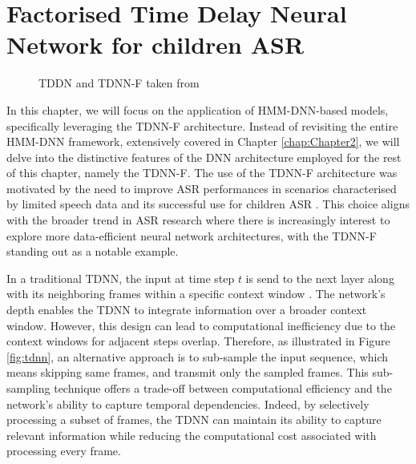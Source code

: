 \section{Factorised Time Delay Neural Network for children ASR}
\label{sec:TDNNF}
\begin{figure}[ht]
    \centering
    \caption{TDDN and TDNN-F taken from \cite{tdnnf-children}}
\end{figure}
In this chapter, we will focus on the application of \ac{HMM-DNN}-based models, specifically leveraging the \ac{TDNN-F} architecture.  Instead of revisiting the entire \ac{HMM-DNN} framework, extensively covered in Chapter \ref{chap:Chapter2}, we will delve into the distinctive features of the \ac{DNN} architecture employed for the rest of this chapter, namely the \ac{TDNN-F}. 
The use of the \ac{TDNN-F} architecture was motivated by the need to improve \ac{ASR} performances in scenarios characterised by limited speech data and its successful use for children \ac{ASR} \cite{tdnnf-children}. This choice aligns with the broader trend in \ac{ASR} research where there is increasingly interest to explore more data-efficient neural network architectures, with the \ac{TDNN-F} standing out as a notable example.

In a traditional \ac{TDNN}, the input at time step $t$ is send to the next layer along with its neighboring frames within a specific context window \cite{tdnn}. The network's depth enables the \ac{TDNN} to integrate information over a broader context window. However, this design can lead to computational inefficiency due to the context windows for adjacent steps overlap. Therefore, as illustrated in Figure \ref{fig:tdnn}, an alternative approach is to sub-sample the input sequence, which means skipping same frames, and transmit only the sampled frames. This sub-sampling technique offers a trade-off between computational efficiency and the network's ability to capture temporal dependencies. Indeed, by selectively processing a subset of frames, the TDNN can maintain its ability to capture relevant information while reducing the computational cost associated with processing every frame.

